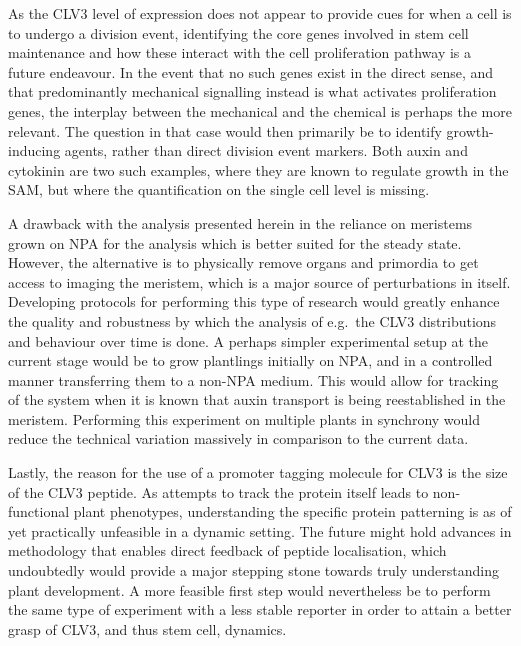 As the CLV3 level of expression does not appear to provide cues for when a cell
is to undergo a division event, identifying the core genes involved in stem cell
maintenance and how these interact with the cell proliferation pathway is a
future endeavour. In the event that no such genes exist in the direct sense,  
and that predominantly mechanical signalling instead is what activates
proliferation genes, the interplay between the mechanical and the chemical is
perhaps the more relevant. The question in that case would then primarily be to identify
growth-inducing agents, rather than direct division event markers. Both auxin
and cytokinin are two such examples,  where they are known to regulate growth in the
SAM, but where the quantification on the single cell level is missing.

A drawback with the analysis presented herein in the reliance on meristems grown
on NPA for the analysis which is better suited for the steady state. However,
the alternative is to physically remove organs and primordia to get access
to imaging the meristem, which is a major source of perturbations in itself.
Developing protocols for performing this type of research would  
greatly enhance the quality and robustness by which the analysis of e.g.\ the
CLV3 distributions and behaviour over time is done. A perhaps simpler
experimental setup at the current stage would be to grow plantlings initially on
NPA, and in a controlled manner transferring them to a non-NPA medium. This
would allow for tracking of the system when it is known that auxin transport is
being reestablished in the meristem. Performing this experiment on multiple
plants in synchrony would reduce the technical variation massively in comparison
to the current data.

Lastly, the reason for the use of a promoter tagging molecule for CLV3 
is the size of the CLV3 peptide. As attempts to track the protein
itself leads to non-functional plant phenotypes, understanding the specific
protein patterning is as of yet practically unfeasible in a dynamic setting. The
future might hold advances in methodology that enables direct feedback of
peptide localisation, which undoubtedly would provide a major stepping stone
towards truly understanding plant development. A more feasible first step would
nevertheless be to perform the same type of experiment with a less stable
reporter in order to attain a better grasp of CLV3, and thus stem cell, dynamics.

